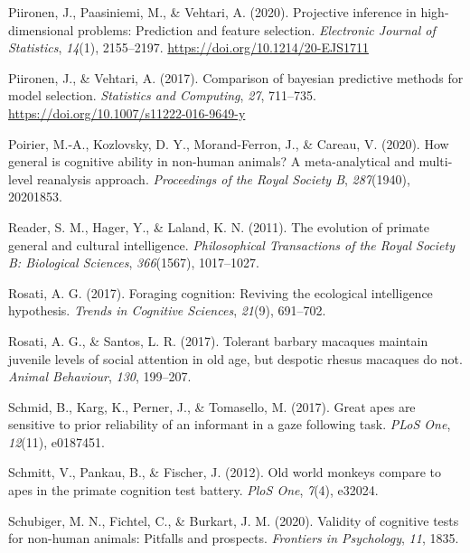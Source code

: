 \documentclass[
  man,floatsintext]{apa6}
\newlength{\cslhangindent}
\newlength{\cslentryspacingunit} %
\newenvironment{CSLReferences}[2] %
 {%
  \setlength{\parindent}{0pt}
  \ifodd #1
  \let\oldpar\par
  \def\par{\hangindent=\cslhangindent\oldpar}
  \fi
  \setlength{\parskip}{#2\cslentryspacingunit}
 }%
 {}
\begin{document}
\begin{CSLReferences}{1}{0}
\leavevmode{}%
Piironen, J., Paasiniemi, M., \& Vehtari, A. (2020). {Projective inference in high-dimensional problems: Prediction and feature selection}. \emph{Electronic Journal of Statistics}, \emph{14}(1), 2155--2197. \url{https://doi.org/10.1214/20-EJS1711}

\leavevmode{}%
Piironen, J., \& Vehtari, A. (2017). Comparison of bayesian predictive methods for model selection. \emph{Statistics and Computing}, \emph{27}, 711--735. \url{https://doi.org/10.1007/s11222-016-9649-y}

\leavevmode{}%
Poirier, M.-A., Kozlovsky, D. Y., Morand-Ferron, J., \& Careau, V. (2020). How general is cognitive ability in non-human animals? A meta-analytical and multi-level reanalysis approach. \emph{Proceedings of the Royal Society B}, \emph{287}(1940), 20201853.

\leavevmode{}%
Reader, S. M., Hager, Y., \& Laland, K. N. (2011). The evolution of primate general and cultural intelligence. \emph{Philosophical Transactions of the Royal Society B: Biological Sciences}, \emph{366}(1567), 1017--1027.

\leavevmode{}%
Rosati, A. G. (2017). Foraging cognition: Reviving the ecological intelligence hypothesis. \emph{Trends in Cognitive Sciences}, \emph{21}(9), 691--702.

\leavevmode{}%
Rosati, A. G., \& Santos, L. R. (2017). Tolerant barbary macaques maintain juvenile levels of social attention in old age, but despotic rhesus macaques do not. \emph{Animal Behaviour}, \emph{130}, 199--207.

\leavevmode{}%
Schmid, B., Karg, K., Perner, J., \& Tomasello, M. (2017). Great apes are sensitive to prior reliability of an informant in a gaze following task. \emph{PLoS One}, \emph{12}(11), e0187451.

\leavevmode{}%
Schmitt, V., Pankau, B., \& Fischer, J. (2012). Old world monkeys compare to apes in the primate cognition test battery. \emph{PloS One}, \emph{7}(4), e32024.

\leavevmode{}%
Schubiger, M. N., Fichtel, C., \& Burkart, J. M. (2020). Validity of cognitive tests for non-human animals: Pitfalls and prospects. \emph{Frontiers in Psychology}, \emph{11}, 1835.


\end{CSLReferences}
\end{document}
